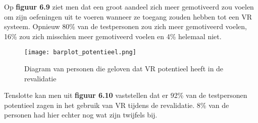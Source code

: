 Op \textbf{figuur 6.9} ziet men dat een groot aandeel zich meer gemotiveerd zou voelen om zijn oefeningen uit te voeren wanneer ze toegang zouden hebben tot een VR systeem. Opnieuw 80\% van de testpersonen zou zich meer gemotiveerd voelen, 16\% zou zich misschien meer gemotiveerd voelen en 4\% helemaal niet.

\begin{figure}[h]
    \centering
    \texttt{[image: barplot\_potentieel.png]}
    \caption{Diagram van personen die geloven dat VR potentieel heeft in de revalidatie}
    \label{figuur 6.10}
\end{figure}

Tenslotte kan men uit \textbf{figuur 6.10} vaststellen dat er 92\% van de testpersonen potentieel zagen in het gebruik van VR tijdens de revalidatie. 8\% van de personen had hier echter nog wat zijn twijfels bij.

